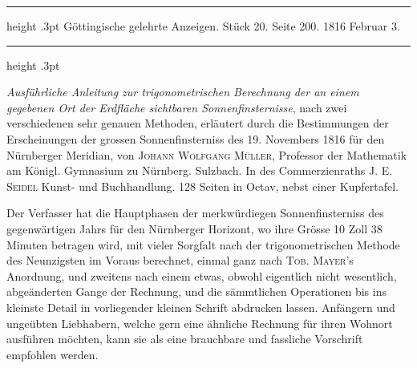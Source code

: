 \par\bigskip
\hypertarget{native-596-lower}{}
\begin{center}
\parbox{.79\linewidth}{%
\centering\small
\hrule height .3pt\relax\vspace{2.5pt}
Göttingische gelehrte Anzeigen. Stück 20. Seite 200. 1816 Februar 3.\par
\vspace{2.5pt}\hrule height .3pt\relax
}
\end{center}

\emph{Ausführliche Anleitung zur trigonometrischen Berechnung der an einem gegebenen Ort der Erdfläche sichtbaren Sonnenfinsternisse}, nach zwei verschiedenen sehr genauen Methoden, erläutert durch die Bestimmungen der Erscheinungen der grossen Sonnenfinsterniss des 19. Novembers 1816 für den Nürnberger Meridian, von \textsc{Johann Wolfgang Müller}, Professor der Mathematik am Königl. Gymnasium zu Nürnberg. Sulzbach. In des Commerzienraths J. E. \textsc{Seidel} Kunst- und Buchhandlung. 128 Seiten in Octav, nebst einer Kupfertafel.

Der Verfasser hat die Hauptphasen der merkwürdiegen Sonnenfinsterniss des gegenwärtigen Jahrs für den Nürnberger Horizont, wo ihre Grösse 10 Zoll 38 Minuten betragen wird, mit vieler Sorgfalt nach der trigonometrischen Methode des Neunzigsten im Voraus berechnet, einmal ganz nach \textsc{Tob. Mayer}'s Anordnung, und zweitens nach einem etwas, obwohl eigentlich nicht wesentlich, abgeänderten Gange der Rechnung, und die sämmtlichen Operationen bis ins kleinste Detail in vorliegender kleinen Schrift abdrucken lassen. Anfängern und ungeübten Liebhabern, welche gern eine ähnliche Rechnung für ihren Wohnort ausführen möchten, kann sie als eine brauchbare und fassliche Vorschrift empfohlen werden.
